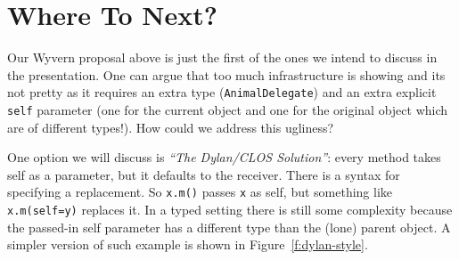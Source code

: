 \documentclass[preprint]{sigplanconf}
\begin{document}






\section{Where To Next?}



Our Wyvern proposal above is just the first of the ones we intend to discuss in the presentation. One can argue that too much infrastructure is showing and its not pretty as it requires an extra type (\texttt{AnimalDelegate}) and an extra explicit \texttt{self} parameter (one for the current object and one for the original object which are of different types!). How could we address this ugliness?

One option we will discuss is \textit{``The Dylan/CLOS Solution''}: every method takes self as a parameter, but it defaults to the receiver. There is a syntax for specifying a replacement. So \texttt{x.m()} passes \texttt{x} as self, but something like \texttt{x.m(self=y)} replaces it. In a typed setting there is still some complexity because the passed-in self parameter has a different type than the (lone) parent object. A simpler version of such example is shown in Figure~\ref{f:dylan-style}.
\end{document}
